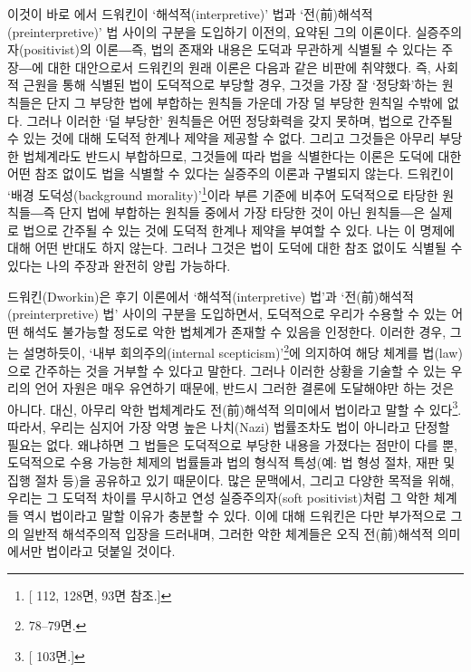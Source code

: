 이것이 바로 에서 드워킨이 `해석적(interpretive)' 법과
`전(前)해석적(preinterpretive)' 법 사이의 구분을 도입하기 이전의, 요약된
그의 이론이다. 실증주의자(positivist)의 이론―즉, 법의 존재와 내용은
도덕과 무관하게 식별될 수 있다는 주장―에 대한 대안으로서 드워킨의 원래
이론은 다음과 같은 비판에 취약했다. 즉, 사회적 근원을 통해 식별된 법이
도덕적으로 부당할 경우, 그것을 가장 잘 `정당화'하는 원칙들은 단지 그
부당한 법에 부합하는 원칙들 가운데 가장 덜 부당한 원칙일 수밖에 없다.
그러나 이러한 `덜 부당한' 원칙들은 어떤 정당화력을 갖지 못하며, 법으로
간주될 수 있는 것에 대해 도덕적 한계나 제약을 제공할 수 없다. 그리고
그것들은 아무리 부당한 법체계라도 반드시 부합하므로, 그것들에 따라 법을
식별한다는 이론은 도덕에 대한 어떤 참조 없이도 법을 식별할 수 있다는
실증주의 이론과 구별되지 않는다. 드워킨이 `배경 도덕성(background
morality)'\footnote{{[} 112, 128면,  93면 참조.{]}}이라
부른 기준에 비추어 도덕적으로 타당한 원칙들―즉 단지 법에 부합하는 원칙들
중에서 가장 타당한 것이 아닌 원칙들―은 실제로 법으로 간주될 수 있는 것에
도덕적 한계나 제약을 부여할 수 있다. 나는 이 명제에 대해 어떤 반대도
하지 않는다. 그러나 그것은 법이 도덕에 대한 참조 없이도 식별될 수 있다는
나의 주장과 완전히 양립 가능하다.

드워킨(Dworkin)은 후기 이론에서 `해석적(interpretive) 법'과
`전(前)해석적(preinterpretive) 법' 사이의 구분을 도입하면서, 도덕적으로
우리가 수용할 수 있는 어떤 해석도 불가능할 정도로 악한 법체계가 존재할
수 있음을 인정한다. 이러한 경우, 그는 설명하듯이, `내부
회의주의(internal scepticism)'\footnote{ 78--79면.}에 의지하여
해당 체계를 법(law)으로 간주하는 것을 거부할 수 있다고 말한다. 그러나
이러한 상황을 기술할 수 있는 우리의 언어 자원은 매우 유연하기 때문에,
반드시 그러한 결론에 도달해야만 하는 것은 아니다. 대신, 아무리 악한
법체계라도 전(前)해석적 의미에서 법이라고 말할 수 있다\footnote{{[}
  103면.{]}}. 따라서, 우리는 심지어 가장 악명 높은 나치(Nazi) 법률조차도
법이 아니라고 단정할 필요는 없다. 왜냐하면 그 법들은 도덕적으로 부당한
내용을 가졌다는 점만이 다를 뿐, 도덕적으로 수용 가능한 체제의 법률들과
법의 형식적 특성(예: 법 형성 절차, 재판 및 집행 절차 등)을 공유하고 있기
때문이다. 많은 문맥에서, 그리고 다양한 목적을 위해, 우리는 그 도덕적
차이를 무시하고 연성 실증주의자(soft positivist)처럼 그 악한 체계들 역시
법이라고 말할 이유가 충분할 수 있다. 이에 대해 드워킨은 다만 부가적으로
그의 일반적 해석주의적 입장을 드러내며, 그러한 악한 체계들은 오직
전(前)해석적 의미에서만 법이라고 덧붙일 것이다.

